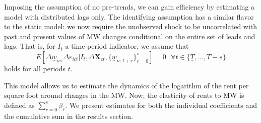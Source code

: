 Imposing the assumption of no pre-trends, we can gain efficiency by estimating a model with 
distributed lags only. %
The identifying assumption has a similar flavor to the static model: we now require the 
unobserved shock to be uncorrelated with past and present values of MW changes conditional 
on the entire set of leads and lags. That is, for $I_t$ a time period indicator, we assume 
that
\begin{equation*}\label{eq:identifying-lags}
	E\left[\Delta \underline{w}_{ic \tau} \Delta \varepsilon_{ict} | 
			I_t, \Delta \mathbf{X}_{ct}, \{\underline{w}_{ic,t+r}\}_{r=0}^s \right] = 0
	\ \ \ \forall t \in \{\underline{T}, ..., \overline{T} - s\} 
\end{equation*}
holds for all periods $t$.


This model allows us to estimate the dynamics of the logarithm of the rent per square foot 
around changes in the MW. Now, the elasticity of rents to MW is defined as $\sum_{r=0}^s 
\beta_r$. We present estimates for both the individual coefficients and the cumulative sum 
in the results section. 



